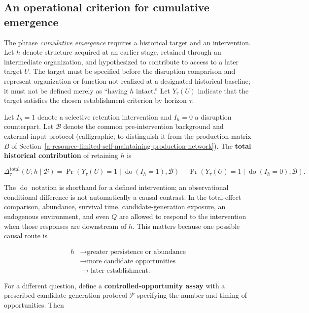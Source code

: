 \documentclass[11pt,a4paper]{article}
\begin{document}
\subsection{An operational criterion for cumulative emergence}

The phrase \emph{cumulative emergence} requires a historical target and an intervention. Let $h$ denote structure acquired at an earlier stage, retained through an intermediate organization, and hypothesized to contribute to access to a later target $U$. The target must be specified before the disruption comparison and represent organization or function not realized at a designated historical baseline; it must not be defined merely as ``having $h$ intact.'' Let $Y_\tau(U)$ indicate that the target satisfies the chosen establishment criterion by horizon $\tau$.

Let $I_h=1$ denote a selective retention intervention and $I_h=0$ a disruption counterpart. Let $\mathcal B$ denote the common pre-intervention background and external-input protocol (calligraphic, to distinguish it from the production matrix $B$ of Section~\ref{a-resource-limited-self-maintaining-production-network}). The \textbf{total historical contribution} of retaining $h$ is

\begin{equation}
\boxed{
\Delta_\tau^{\mathrm{total}}(U;h\mid\mathcal B)
=
\Pr\!\left(Y_\tau(U)=1\mid\operatorname{do}(I_h=1),\mathcal B\right)
-
\Pr\!\left(Y_\tau(U)=1\mid\operatorname{do}(I_h=0),\mathcal B\right).
}
\label{eq:historical-total}
\end{equation}

The $\operatorname{do}$ notation is shorthand for a defined intervention; an observational conditional difference is not automatically a causal contrast. In the total-effect comparison, abundance, survival time, candidate-generation exposure, an endogenous environment, and even $Q$ are allowed to respond to the intervention when those responses are downstream of $h$. This matters because one possible causal route is

\[
\begin{aligned}
h&\to\text{greater persistence or abundance}\\
 &\to\text{more candidate opportunities}\\
 &\to\text{later establishment}.
\end{aligned}
\]

For a different question, define a \textbf{controlled-opportunity assay} with a prescribed candidate-generation protocol $\mathcal P$ specifying the number and timing of opportunities. Then
\end{document}
